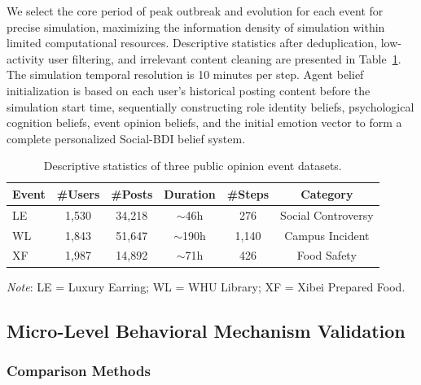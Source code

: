 \documentclass[a4paper,fleqn]{cas-dc}
\renewcommand{\footnotesize}{\scriptsize}
\begin{document}
We select the core period of peak outbreak and evolution for each event for precise simulation, maximizing the information density of simulation within limited computational resources. Descriptive statistics after deduplication, low-activity user filtering, and irrelevant content cleaning are presented in Table~\ref{tab:dataset}. The simulation temporal resolution is 10 minutes per step. Agent belief initialization is based on each user's historical posting content before the simulation start time, sequentially constructing role identity beliefs, psychological cognition beliefs, event opinion beliefs, and the initial emotion vector to form a complete personalized Social-BDI belief system.

\begin{table}[!t]
\centering
\caption{Descriptive statistics of three public opinion event datasets.}
\label{tab:dataset}
\footnotesize
\renewcommand{\arraystretch}{1.05}
\begin{tabular}{@{}lccccc@{}}
\toprule
\textbf{Event} & \textbf{\#Users} & \textbf{\#Posts} & \textbf{Duration} & \textbf{\#Steps} & \textbf{Category} \\
\midrule
LE & 1,530 & 34,218 & ${\sim}$46h & 276 & Social Controversy \\
WL & 1,843 & 51,647 & ${\sim}$190h & 1,140 & Campus Incident \\
XF & 1,987 & 14,892 & ${\sim}$71h & 426 & Food Safety \\
\bottomrule
\end{tabular}
\par\vspace{2pt}
{\scriptsize{}\selectfont
\textit{Note}: LE = Luxury Earring; WL = WHU Library; XF = Xibei Prepared Food.}
\end{table}

\subsection{Micro-Level Behavioral Mechanism Validation}\label{subsec:micro}


\subsubsection{Comparison Methods}
\end{document}
